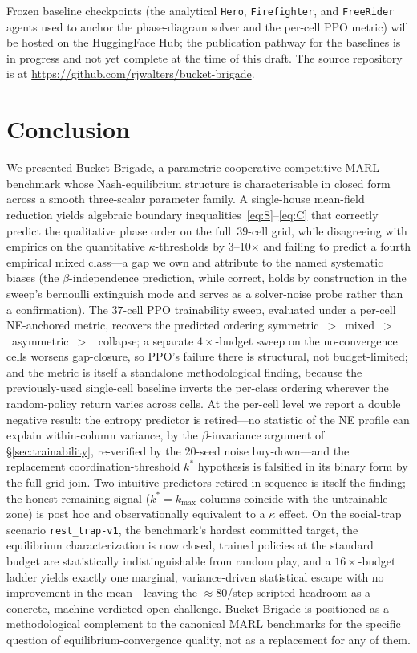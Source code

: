 \documentclass{anvil-paper}
\begin{document}
Frozen baseline checkpoints (the analytical \texttt{Hero},
\texttt{Firefighter}, and \texttt{FreeRider} agents used to anchor the
phase-diagram solver and the per-cell PPO metric) will be hosted on the
HuggingFace Hub; the publication pathway for the baselines is in progress
and not yet complete at the time of this draft. The source repository is at
\url{https://github.com/rjwalters/bucket-brigade}.

\section*{Conclusion}

We presented Bucket Brigade, a parametric cooperative-competitive MARL
benchmark whose Nash-equilibrium structure is characterisable in closed form
across a smooth three-scalar parameter family. A single-house mean-field
reduction yields algebraic boundary inequalities~\eqref{eq:S}--\eqref{eq:C}
that correctly predict the qualitative phase order on the full~$39$-cell
grid, while disagreeing with empirics on the quantitative
$\kappa$-thresholds by 3--10$\times$ and failing to predict a fourth
empirical \textsf{mixed} class---a gap we own and attribute to the named
systematic biases (the $\beta$-independence prediction, while correct,
holds by construction in the sweep's bernoulli extinguish mode and
serves as a solver-noise probe rather than a confirmation). The
$37$-cell PPO trainability sweep, evaluated under a per-cell NE-anchored
metric, recovers the predicted ordering
\textsf{symmetric}~$>$~\textsf{mixed}~$>$~\textsf{asymmetric}~$>$~%
\textsf{collapse}; a separate $4{\times}$-budget sweep on the
no-convergence cells worsens gap-closure, so PPO's failure there is
structural, not budget-limited; and the metric is itself a standalone
methodological finding, because the previously-used single-cell baseline
inverts the per-class ordering wherever the random-policy return varies
across cells. At the per-cell level we report a double negative
result: the entropy predictor is retired---no statistic of the NE
profile can explain within-column variance, by the $\beta$-invariance
argument of \S\ref{sec:trainability}, re-verified by the $20$-seed
noise buy-down---and the replacement coordination-threshold $k^{*}$
hypothesis is falsified in its binary form by the full-grid join. Two
intuitive predictors retired in sequence is itself the finding; the
honest remaining signal ($k^{*}{=}k_{\max}$ columns coincide with the
untrainable zone) is post hoc and observationally equivalent to a
$\kappa$ effect. On the social-trap scenario \texttt{rest\_trap-v1},
the benchmark's hardest committed target, the equilibrium
characterization is now closed, trained policies at the standard budget
are statistically indistinguishable from random play, and a
$16{\times}$-budget ladder yields exactly one marginal, variance-driven
statistical escape with no improvement in the mean---leaving the
${\approx}80$/step scripted headroom as a concrete, machine-verdicted
open challenge. Bucket Brigade is positioned as a methodological
complement to the canonical MARL benchmarks for the specific question of
equilibrium-convergence quality, not as a replacement for any of them.
\end{document}
